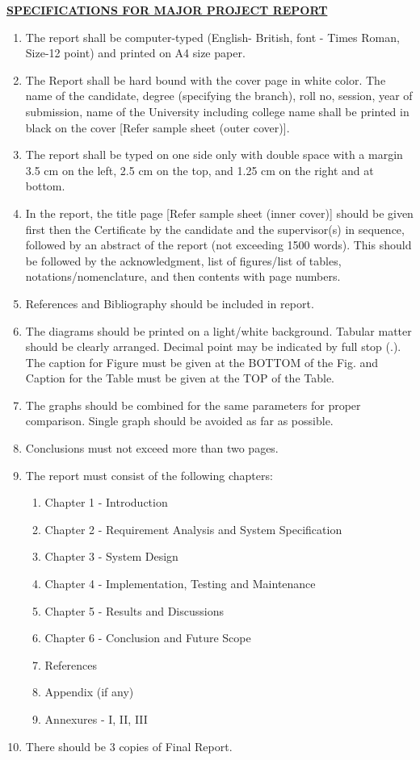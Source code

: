 \documentclass[12pt,a4paper]{report}
\begin{document}
\newpage
{}
\setcounter{page}{1}  

{\raggedright
    \fontsize{18pt}{20pt}\selectfont\textbf{\underline{SPECIFICATIONS FOR MAJOR PROJECT REPORT}}\par
}

\begin{enumerate}[left=0pt, labelsep=0.5em, itemindent=0pt]
    \item The report shall be computer-typed (English- British, font - Times Roman, Size-12 point) and printed on A4 size paper.
    \item The Report shall be hard bound with the cover page in white color. The name of the candidate, degree (specifying the branch), roll no, session, year of submission, name of the University including college name shall be printed in black on the cover [Refer sample sheet (outer cover)].
    \item The report shall be typed on one side only with double space with a margin 3.5 cm on the left, 2.5 cm on the top, and 1.25 cm on the right and at bottom.
    \item In the report, the title page [Refer sample sheet (inner cover)] should be given first then the Certificate by the candidate and the supervisor(s) in sequence, followed by an abstract of the report (not exceeding 1500 words). This should be followed by the acknowledgment, list of figures/list of tables, notations/nomenclature, and then contents with page numbers.
    \item References and Bibliography should be included in report.
    \item The diagrams should be printed on a light/white background. Tabular matter should be clearly arranged. Decimal point may be indicated by full stop (.). The caption for Figure must be given at the BOTTOM of the Fig. and Caption for the Table must be given at the TOP of the Table.
    \item The graphs should be combined for the same parameters for proper comparison. Single graph should be avoided as far as possible.
    \item Conclusions must not exceed more than two pages.
    \item The report must consist of the following chapters:
    \begin{enumerate}
        \item Chapter 1 - Introduction
        \item Chapter 2 - Requirement Analysis and System Specification
        \item Chapter 3 - System Design
        \item Chapter 4 - Implementation, Testing and Maintenance
        \item Chapter 5 - Results and Discussions
        \item Chapter 6 - Conclusion and Future Scope
        \item References
        \item Appendix (if any)
        \item Annexures - I, II, III
    \end{enumerate}
    \item There should be 3 copies of Final Report.
\end{enumerate}
\end{document}
